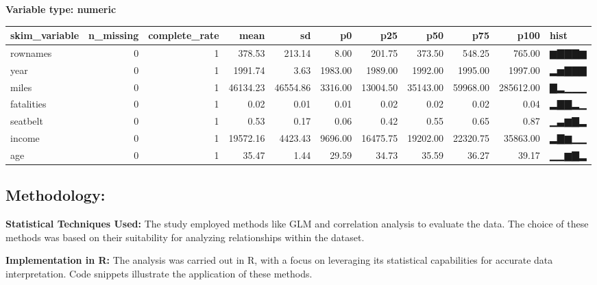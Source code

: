 \documentclass[
]{article}
\newenvironment{Shaded}{\begin{snugshade}}{\end{snugshade}}
\newcommand{\CommentTok}[1]{\textcolor[rgb]{0.56,0.35,0.01}{\textit{#1}}}
\newcommand{\FunctionTok}[1]{\textcolor[rgb]{0.00,0.00,0.00}{#1}}
\newcommand{\NormalTok}[1]{#1}
\newcommand{\OtherTok}[1]{\textcolor[rgb]{0.56,0.35,0.01}{#1}}
\newcommand{\SpecialCharTok}[1]{\textcolor[rgb]{0.00,0.00,0.00}{#1}}
\begin{document}
\textbf{Variable type: numeric}

\begin{longtable}[]{@{}lrrrrrrrrrl@{}}
\toprule
skim\_variable & n\_missing & complete\_rate & mean & sd & p0 & p25 &
p50 & p75 & p100 & hist \\
\midrule
\endhead
rownames & 0 & 1 & 378.53 & 213.14 & 8.00 & 201.75 & 373.50 & 548.25 &
765.00 & ▆▇▇▇▆ \\
year & 0 & 1 & 1991.74 & 3.63 & 1983.00 & 1989.00 & 1992.00 & 1995.00 &
1997.00 & ▂▅▇▇▇ \\
miles & 0 & 1 & 46134.23 & 46554.86 & 3316.00 & 13004.50 & 35143.00 &
59968.00 & 285612.00 & ▇▂▁▁▁ \\
fatalities & 0 & 1 & 0.02 & 0.01 & 0.01 & 0.02 & 0.02 & 0.02 & 0.04 &
▂▇▇▂▁ \\
seatbelt & 0 & 1 & 0.53 & 0.17 & 0.06 & 0.42 & 0.55 & 0.65 & 0.87 &
▁▃▆▇▂ \\
income & 0 & 1 & 19572.16 & 4423.43 & 9696.00 & 16475.75 & 19202.00 &
22320.75 & 35863.00 & ▂▇▆▁▁ \\
age & 0 & 1 & 35.47 & 1.44 & 29.59 & 34.73 & 35.59 & 36.27 & 39.17 &
▁▁▆▇▂ \\
\bottomrule
\end{longtable}

\hypertarget{methodology}{%
\subsection{Methodology:}\label{methodology}}

\textbf{Statistical Techniques Used:} The study employed methods like
GLM and correlation analysis to evaluate the data. The choice of these
methods was based on their suitability for analyzing relationships
within the dataset.

\textbf{Implementation in R:} The analysis was carried out in R, with a
focus on leveraging its statistical capabilities for accurate data
interpretation. Code snippets illustrate the application of these
methods.

\begin{Shaded}
\end{Shaded}
\end{document}
